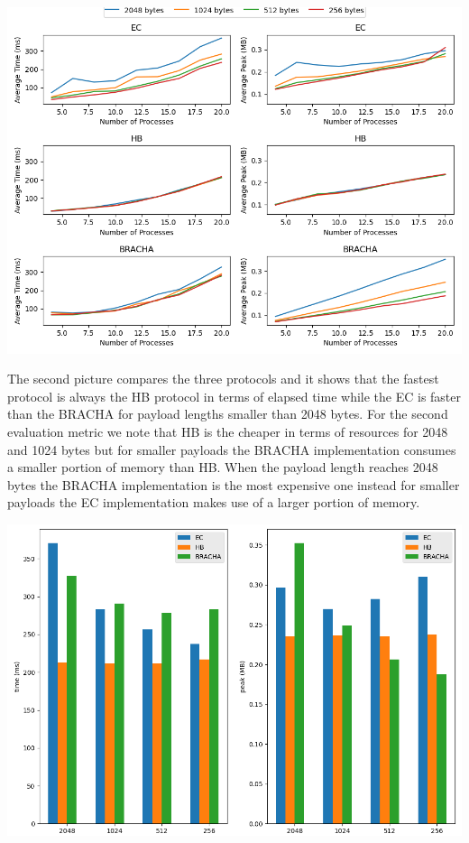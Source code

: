 \documentclass[12pt]{article}
\begin{document}
\begin{center}
\includegraphics[scale=0.55]{graph.png}
\end{center}
The second picture compares the three protocols and it shows that the fastest protocol is always the HB protocol in terms of elapsed time while the EC is faster than the BRACHA for payload lengths smaller than 2048 bytes. For the second evaluation metric we note that HB is the cheaper in terms of resources for 2048 and 1024 bytes but for smaller payloads the BRACHA implementation consumes a smaller portion of memory than HB. When the payload length reaches 2048 bytes the BRACHA implementation is the most expensive one instead for smaller payloads the EC implementation makes use of a larger portion of memory.
\begin{center}
\includegraphics[scale=0.45]{bar_graph.png}
\end{center}
\end{document}
